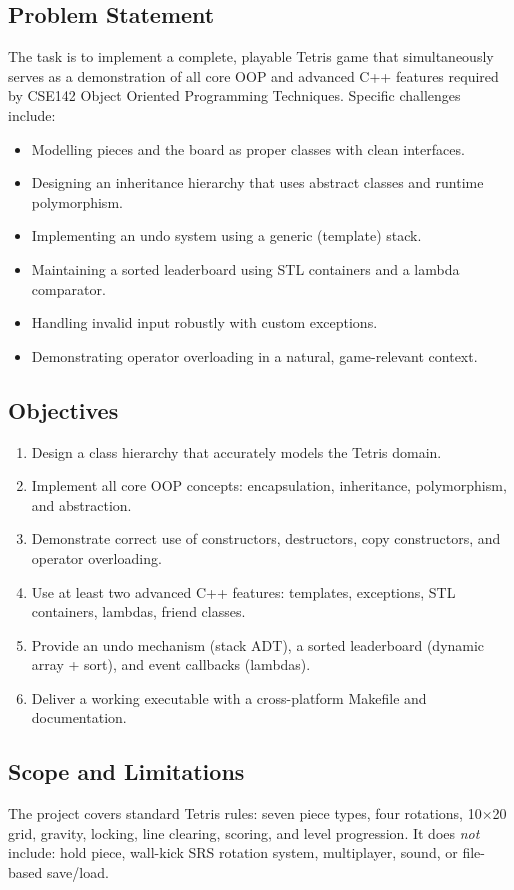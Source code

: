 \documentclass[11pt]{article}
\newcommand{\mycourse}{CSE142 Object Oriented Programming Techniques}
\begin{document}
\subsection{Problem Statement}
The task is to implement a complete, playable Tetris game that simultaneously serves as a
demonstration of all core OOP and advanced C++ features required by \mycourse.
Specific challenges include:
\begin{itemize}
    \item Modelling pieces and the board as proper classes with clean interfaces.
    \item Designing an inheritance hierarchy that uses abstract classes and runtime polymorphism.
    \item Implementing an undo system using a generic (template) stack.
    \item Maintaining a sorted leaderboard using STL containers and a lambda comparator.
    \item Handling invalid input robustly with custom exceptions.
    \item Demonstrating operator overloading in a natural, game-relevant context.
\end{itemize}

\subsection{Objectives}
\begin{enumerate}
    \item Design a class hierarchy that accurately models the Tetris domain.
    \item Implement all core OOP concepts: encapsulation, inheritance, polymorphism, and abstraction.
    \item Demonstrate correct use of constructors, destructors, copy constructors, and operator overloading.
    \item Use at least two advanced C++ features: templates, exceptions, STL containers, lambdas, friend classes.
    \item Provide an undo mechanism (stack ADT), a sorted leaderboard (dynamic array + sort), and event callbacks (lambdas).
    \item Deliver a working executable with a cross-platform Makefile and documentation.
\end{enumerate}

\subsection{Scope and Limitations}
The project covers standard Tetris rules: seven piece types, four rotations, 10$\times$20 grid,
gravity, locking, line clearing, scoring, and level progression.
It does \emph{not} include: hold piece, wall-kick SRS rotation system, multiplayer, sound, or file-based save/load.
\end{document}

